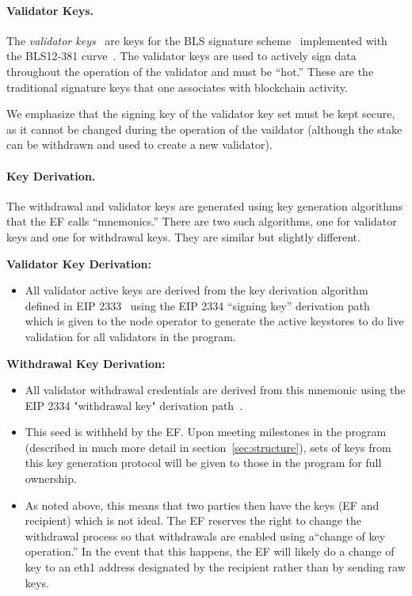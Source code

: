 \paragraph{Validator Keys.}  The \emph{validator keys}~\cite{EthVal} are keys for the BLS signature scheme~\cite{AC:BonLynSha01} implemented with the BLS12-381 curve~\cite{BLS12-318}.  The validator keys are used to actively sign data throughout the operation of the validator and must be ``hot.'' These are the traditional signature keys that one associates with blockchain activity.

We emphasize that the signing key of the validator key set must be kept secure, as it cannot be changed during the operation of the vaildator (although the stake can be withdrawn and used to create a new validator).

\paragraph{Key Derivation.}  The withdrawal and validator keys are generated using key generation algorithms that the EF calls ``mnemonics.'' There are two such algorithms, one for validator keys and one for withdrawal keys. They are similar but slightly different.

\medskip

\textbf{Validator Key Derivation:}
\begin{itemize}
 \item All validator active keys are derived from the key derivation algorithm defined in EIP 2333~\cite{EthBLSKeyGen} using the EIP 2334 ``signing key'' derivation path~\cite{EthBLSHierarchy} which is
given to the node operator to generate the active keystores to do live validation for all validators in the program.
\end{itemize}

\textbf{Withdrawal Key Derivation:}
\begin{itemize}
\item All validator withdrawal credentials are derived from this mnemonic using the EIP 2334 "withdrawal key" derivation path~\cite{EthBLSHierarchy}.
\item This seed is withheld by the EF. Upon meeting milestones in the program (described in much more detail in section~\ref{sec:structure}), sets of keys from this key generation protocol will be given to those in the program for full ownership.
\item  As noted above, this means that two parties then have the keys (EF and recipient) which is not ideal.  The EF reserves the right to change the withdrawal process so that withdrawals are enabled using a``change of key operation.'' In the event that this happens, the EF will likely do a change of key to an eth1 address designated by the recipient rather than by sending raw keys. 
\end{itemize}


